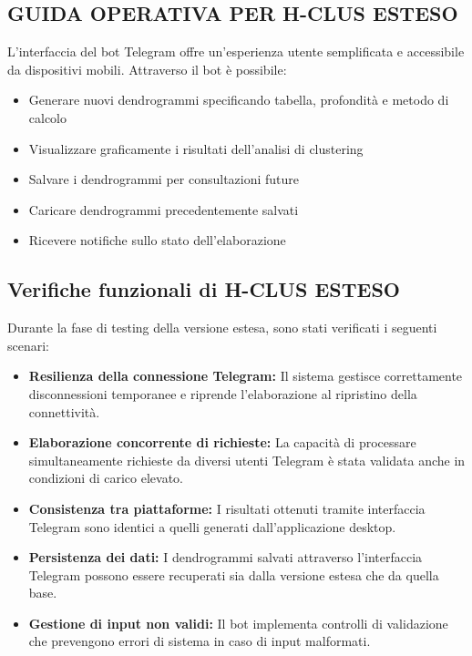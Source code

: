 \subsection{GUIDA OPERATIVA PER H-CLUS ESTESO}


L'interfaccia del bot Telegram offre un'esperienza utente semplificata e accessibile da dispositivi mobili. Attraverso il bot è possibile:

\begin{itemize}
    \item Generare nuovi dendrogrammi specificando tabella, profondità e metodo di calcolo
    \item Visualizzare graficamente i risultati dell'analisi di clustering
    \item Salvare i dendrogrammi per consultazioni future
    \item Caricare dendrogrammi precedentemente salvati
    \item Ricevere notifiche sullo stato dell'elaborazione
\end{itemize}

\subsection{Verifiche funzionali di H-CLUS ESTESO}

Durante la fase di testing della versione estesa, sono stati verificati i seguenti scenari:

\begin{itemize}
    \item \textbf{Resilienza della connessione Telegram:} 
    Il sistema gestisce correttamente disconnessioni temporanee e riprende l'elaborazione al ripristino della connettività.
    
    \item \textbf{Elaborazione concorrente di richieste:} 
    La capacità di processare simultaneamente richieste da diversi utenti Telegram è stata validata anche in condizioni di carico elevato.
    
    \item \textbf{Consistenza tra piattaforme:} 
    I risultati ottenuti tramite interfaccia Telegram sono identici a quelli generati dall'applicazione desktop.
    
    \item \textbf{Persistenza dei dati:} 
    I dendrogrammi salvati attraverso l'interfaccia Telegram possono essere recuperati sia dalla versione estesa che da quella base.
    
    \item \textbf{Gestione di input non validi:} 
    Il bot implementa controlli di validazione che prevengono errori di sistema in caso di input malformati.
\end{itemize}
